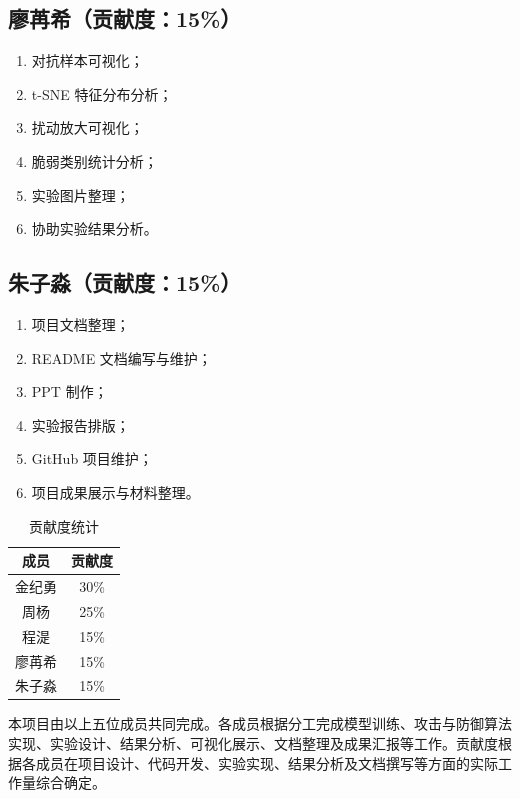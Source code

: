 \documentclass[UTF8,a4paper,12pt]{ctexart}
\begin{document}
\subsection*{廖苒希（贡献度：15\%）}
\begin{enumerate}
    \item 对抗样本可视化；
    \item t-SNE 特征分布分析；
    \item 扰动放大可视化；
    \item 脆弱类别统计分析；
    \item 实验图片整理；
    \item 协助实验结果分析。
\end{enumerate}

\subsection*{朱子淼（贡献度：15\%）}
\begin{enumerate}
    \item 项目文档整理；
    \item README 文档编写与维护；
    \item PPT 制作；
    \item 实验报告排版；
    \item GitHub 项目维护；
    \item 项目成果展示与材料整理。
\end{enumerate}

\begin{table}[H]
    \centering
    \caption{贡献度统计}
    \begin{tabular}{cc}
        \toprule
        成员 & 贡献度 \\
        \midrule
        金纪勇 & 30\% \\
        周杨 & 25\% \\
        程湜 & 15\% \\
        廖苒希 & 15\% \\
        朱子淼 & 15\% \\
        \bottomrule
    \end{tabular}
\end{table}

本项目由以上五位成员共同完成。各成员根据分工完成模型训练、攻击与防御算法实现、实验设计、结果分析、可视化展示、文档整理及成果汇报等工作。贡献度根据各成员在项目设计、代码开发、实验实现、结果分析及文档撰写等方面的实际工作量综合确定。
\end{document}
